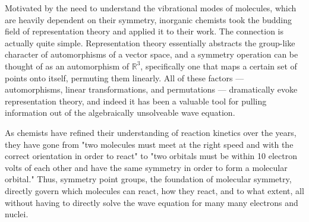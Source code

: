 \documentclass[openany, amssymb, psamsfonts]{amsart}
\theoremstyle{definition}
\numberwithin{equation}{section}
\begin{document}
Motivated by the need to understand the vibrational modes of molecules, which are heavily dependent on their symmetry, inorganic chemists took the budding field of representation theory and applied it to their work. The connection is actually quite simple. Representation theory essentially abstracts the group-like character of automorphisms of a vector space, and a symmetry operation can be thought of as an automorphism of $\mathbb{R}^3$, specifically one that maps a certain set of points onto itself, permuting them linearly. All of these factors --- automorphisms, linear transformations, and permutations --- dramatically evoke representation theory, and indeed it has been a valuable tool for pulling information out of the algebraically unsolveable wave equation.\par
As chemists have refined their understanding of reaction kinetics over the years, they have gone from "two molecules must meet at the right speed and with the correct orientation in order to react" to "two orbitals must be within 10 electron volts of each other and have the same symmetry in order to form a molecular orbital." Thus, symmetry point groups, the foundation of molecular symmetry, directly govern which molecules can react, how they react, and to what extent, all without having to directly solve the wave equation for many many electrons and nuclei.\par
\begin{center}
\end{center}
\end{document}
